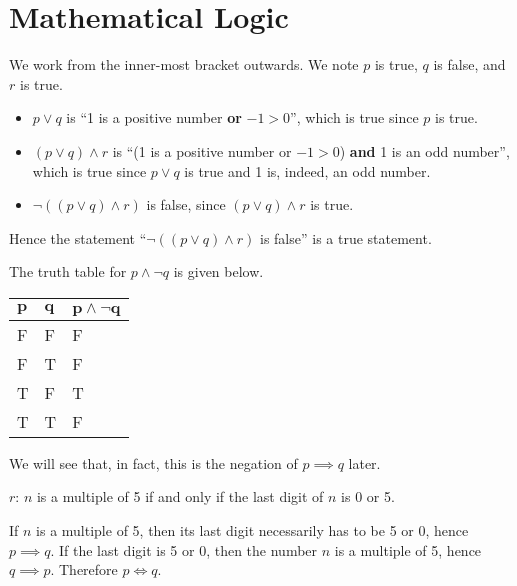 \section{Mathematical Logic}
\begin{questions}
    \item We work from the inner-most bracket outwards. We note $p$ is true, $q$ is false, and $r$ is true.
    \begin{itemize}
        \item $p \lor q$ is ``1 is a positive number \textbf{or} $-1 > 0$'', which is true since $p$ is true.
        \item $(p \lor q) \land r$ is ``(1 is a positive number or $-1 > 0$) \textbf{and} 1 is an odd number'', which is true since $p \lor q$ is true and 1 is, indeed, an odd number.
        \item $\lnot((p \lor q) \land r)$ is false, since $(p \lor q) \land r$ is true.
    \end{itemize}
    Hence the statement ``$\lnot((p \lor q) \land r)$ is false'' is a true statement.

    \item The truth table for $p \land \lnot q$ is given below.
    \begin{table}[H]
        \centering
        \begin{tabular}{|l|l||l|}
            \hline
            $\boldsymbol{p}$ & $\boldsymbol{q}$ & $\boldsymbol{p\land \lnot q}$ \\ \hline
            F   & F   & F                  \\ \hline
            F   & T   & F                  \\ \hline
            T   & F   & T                  \\ \hline
            T   & T   & F                  \\ \hline
        \end{tabular}
    \end{table}

    We will see that, in fact, this is the negation of $p \implies q$ later.

    \item \begin{partquestions}{\roman*}
        \item $r$: $n$ is a multiple of 5 if and only if the last digit of $n$ is 0 or 5.
        \item If $n$ is a multiple of 5, then its last digit necessarily has to be 5 or 0, hence $p \implies q$. If the last digit is 5 or 0, then the number $n$ is a multiple of 5, hence $q \implies p$. Therefore $p \iff q$.
    \end{partquestions}


\end{questions}
